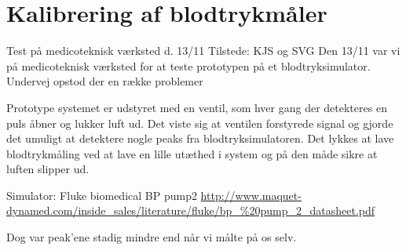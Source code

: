 \section{Kalibrering af blodtrykmåler}
Test på medicoteknisk værksted d. 13/11
Tilstede: KJS og SVG
Den 13/11 var vi på medicoteknisk værksted for at teste prototypen på et blodtryksimulator. Undervej opstod der en række problemer

Prototype systemet er udstyret med en ventil, som hver gang der detekteres en puls åbner og lukker luft ud. Det viste sig at ventilen forstyrede signal og gjorde det umuligt at detektere nogle peaks fra blodtryksimulatoren. Det lykkes at lave blodtrykmåling ved at lave en lille utæthed i system og på den måde sikre at luften slipper ud. 

Simulator: 
Fluke biomedical BP pump2
\url{http://www.maquet-dynamed.com/inside_sales/literature/fluke/bp_\%20pump_2_datasheet.pdf}

Dog var peak’ene stadig mindre end når vi målte på os selv. 


